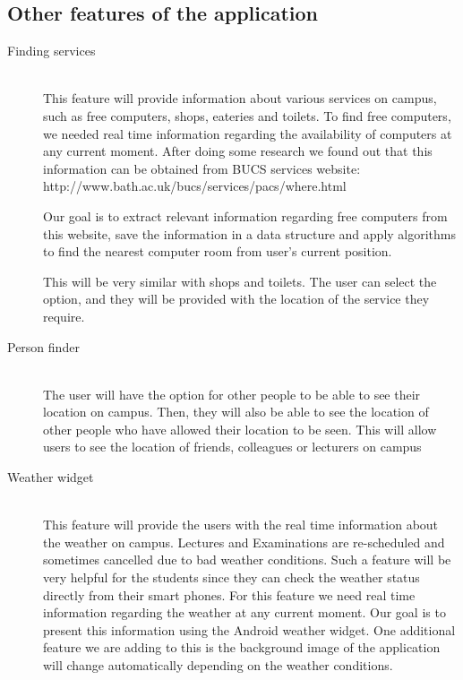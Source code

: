 \documentclass[10pt,a4paper,oneside]{report}
\begin{document}
\subsection*{Other features of the application}
\begin{description}
\item[Finding services] \hfill \\
This feature will provide information about various services on campus, such as free computers,
shops, eateries and toilets. To find free computers, we needed real time information regarding the
availability of computers at any current moment. After doing some research we found out that this
information can be obtained from BUCS services website:
http://www.bath.ac.uk/bucs/services/pacs/where.html

Our goal is to extract relevant information regarding free computers from this website, save the
information in a data structure and apply algorithms to find the nearest computer room from user's
current position.

This will be very similar with shops and toilets. The user can select the option, and they will be
provided with the location of the service they require.
\item[Person finder] \hfill \\
The user will have the option for other people to be able to see their location on campus. Then, they
will also be able to see the location of other people who have allowed their location to be seen. This
will allow users to see the location of friends, colleagues or lecturers on campus
\item[Weather widget] \hfill \\
This feature will provide the users with the real time information about the weather on campus.
Lectures and Examinations are re-scheduled and sometimes cancelled due to bad weather
conditions. Such a feature will be very helpful for the students since they can check the weather
status directly from their smart phones. For this feature we need real time information regarding the
weather at any current moment. Our goal is to present this information using the Android weather
widget. One additional feature we are adding to this is the background image of the application will
change automatically depending on the weather conditions.
\end{description}
\end{document}

